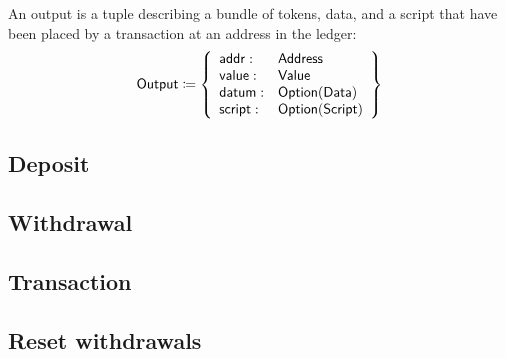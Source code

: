 \documentclass[../hydrozoa.tex]{subfiles}
\begin{document}
An output is a tuple describing a bundle of tokens, data, and a script that have been placed by a transaction at an address in the ledger:
\begin{equation*}
    \mathsf{Output} \coloneq \left\{
    \begin{array}{ll}
        \mathsf{addr} : & \mathsf{Address} \\
        \mathsf{value} : & \mathsf{Value} \\
        \mathsf{datum} : & \mathsf{Option(Data)} \\
        \mathsf{script} : & \mathsf{Option(Script)}
    \end{array} \right\}
\end{equation*}

\subsection{Deposit}%
\label{h:ledger-deposit}

\subsection{Withdrawal}%
\label{h:ledger-withdrawal}

\subsection{Transaction}%
\label{h:ledger-transaction}

\subsection{Reset withdrawals}%
\label{h:ledger-reset-withdrawals}
\end{document}
